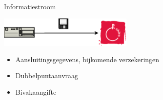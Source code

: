\documentclass[chiro,pdf]{prosper}
\begin{document}
{
\begin{slide}{Informatiestroom}

\begin{center}
\includegraphics[height=15mm]{images/chirogroep-vroeger.eps}
\end{center}

\begin{itemize}
\item Aansluitingsgegevens, bijkomende verzekeringen
\item Dubbelpuntaanvraag
\item Bivakaangifte
\end{itemize}

\end{slide}
}


%
%
\end{document}
